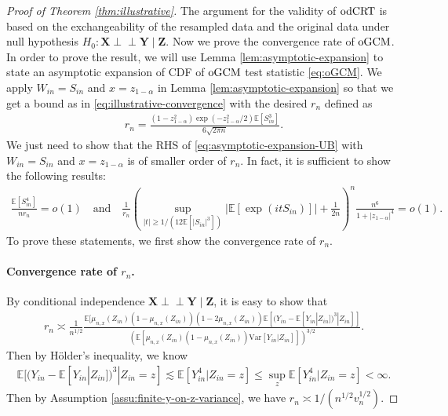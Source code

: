 \documentclass[12pt]{article}
\theoremstyle{definition}
\newcommand{\indep}{\perp \!\!\! \perp}
\newcommand{\E}{\mathbb E}								%
\newcommand{\prx}{\bm X}								%
\newcommand{\prz}{\bm Z}								%
\newcommand{\srz}{Z}									%
\newcommand{\pry}{{\bm Y}}								%
\newcommand{\sry}{Y}									%
\newcommand{\odCRT}{\textnormal{odCRT}} 					%
\newcommand{\oGCM}{\textnormal{oGCM}}						%
\begin{document}
\begin{proof}[Proof of Theorem \ref{thm:illustrative}]
  The argument for the validity of $\odCRT$ is based on the exchangeability of the resampled data and the original data under null hypothesis $H_0:\prx\indep\pry\mid \prz$. Now we prove the convergence rate of $\oGCM$. In order to prove the result, we will use Lemma \ref{lem:asymptotic-expansion} to state an asymptotic expansion of CDF of $\oGCM$ test statistic \eqref{eq:oGCM}. We apply $W_{in}=S_{in}$ and $x=z_{1-\alpha}$ in Lemma \ref{lem:asymptotic-expansion} so that we get a bound as in \eqref{eq:illustrative-convergence} with the desired $r_n$ defined as 
  \begin{align*}
	r_n=\frac{(1-z_{1-\alpha}^2)\exp(-z_{1-\alpha}^2/2)\E[S_{in}^3]}{6\sqrt{2\pi n}}.
  \end{align*}
  We just need to show that the RHS of \eqref{eq:asymptotic-expansion-UB} with $W_{in}=S_{in}$ and $x=z_{1-\alpha}$ is of smaller order of $r_n$. In fact, it is sufficient to show the following results:
  \begin{align*}
	\frac{\E[S_{in}^4]}{nr_n}=o(1)\quad\text{and}\quad \frac{1}{r_n}\left(\sup_{|t|\geq 1/ (12\E[|S_{in}|^3])}|\E[\exp(itS_{in})]|+\frac{1}{2n}\right)^n\frac{n^6}{1+|z_{1-\alpha}|^4}=o(1).
  \end{align*}
  To prove these statements, we first show the convergence rate of $r_n$. 
  \paragraph{Convergence rate of $r_n$.}
  By conditional independence $\prx\indep\pry\mid \prz$, it is easy to show that
  \begin{align*}
	r_n\asymp \frac{1}{n^{1/2}}\frac{\E[\mu_{n,x}(\srz_{in})(1-\mu_{n,x}(\srz_{in}))(1-2\mu_{n,x}(\srz_{in}))\E[(\sry_{in}-\E[\sry_{in}|\srz_{in}])^3|\srz_{in}]]}{(\E[\mu_{n,x}(\srz_{in})(1-\mu_{n,x}(\srz_{in}))\mathrm{Var}[\sry_{in}|\srz_{in}]])^{3/2}}.
  \end{align*} 
  Then by H\"older's inequality, we know
  \begin{align*}
	\E[(\sry_{in}-\E[\sry_{in}|\srz_{in}])^3|\srz_{in}=z]\lesssim \E[\sry_{in}^4|\srz_{in}=z]\leq \sup_z \E[\sry_{in}^4|\srz_{in}=z]<\infty.
  \end{align*}
  Then by Assumption \ref{assu:finite-y-on-z-variance}, we have $r_n\asymp 1/(n^{1/2}v_n^{1/2})$.

\end{proof}
\end{document}
